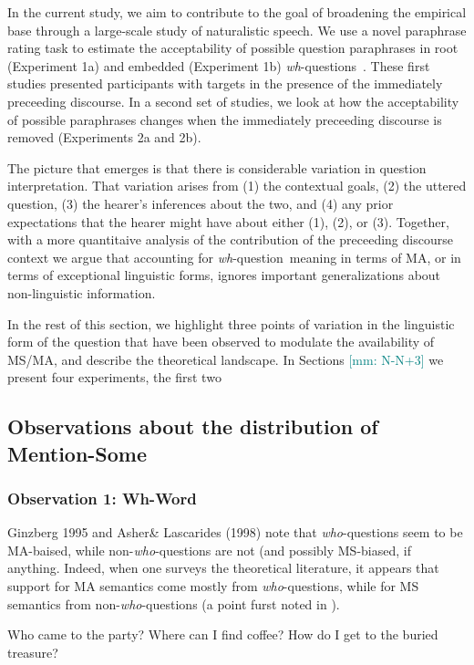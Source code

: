 \documentclass[12pt,letterpaper,table,svgnames,dvipsnames]{article}
\newcommand{\mm}[1]{\textcolor{teal}{[mm: #1]}}
\newcommand{\whq}{\emph{wh}-question~}
\newcommand{\whqs}{\emph{wh}-questions~}
\begin{document}
In the current study, we aim to contribute to the goal of broadening the empirical base through a large-scale study of naturalistic speech. We use a novel paraphrase rating task to estimate the acceptability of possible question paraphrases in root (Experiment 1a) and embedded (Experiment 1b) \whqs. These first studies presented participants with targets in the presence of the immediately preceeding discourse. In a second set of studies, we look at how the acceptability of possible paraphrases changes when the immediately preceeding discourse is removed (Experiments 2a and 2b). 

The picture that emerges is that there is considerable variation in question interpretation. That variation arises from (1) the contextual goals, (2) the uttered question, (3) the hearer's inferences about the two, and (4) any prior expectations that the hearer might have about either (1), (2), or (3). Together, with a more quantitaive analysis of the contribution of the preceeding discourse context we argue that accounting for \whq meaning in terms of MA, or in terms of exceptional linguistic forms, ignores important generalizations about non-linguistic information.


In the rest of this section, we highlight three points of variation in the linguistic form of the question that have been observed to modulate the availability of MS/MA, and describe the theoretical landscape. In Sections \mm{N-N+3} we present four experiments, the first two 

\subsection{Observations about the distribution of Mention-Some}

\subsubsection{Observation 1: Wh-Word}
Ginzberg 1995 and Asher\& Lascarides (1998) note that \emph{who}-questions seem to be MA-baised, while non-\emph{who}-questions are not (and possibly MS-biased, if anything. Indeed, when one surveys the theoretical literature, it appears that support for MA semantics come mostly from \emph{who}-questions, while for MS semantics from non-\emph{who}-questions (a point furst noted in \cite{asherlascarides1998}).

\begin{exe}
\ex {}\label{whcline}
    \begin{xlist}
    \ex Who came to the party?
    \ex Where can I find coffee?
    \ex How do I get to the buried treasure?
    \end{xlist}
\end{exe}
\end{document}
